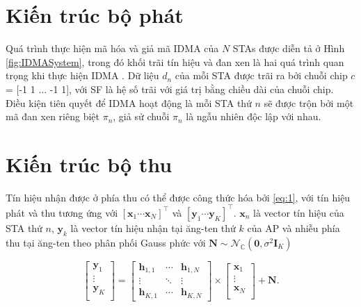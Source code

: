 \section{Kiến trúc bộ phát}\label{IIA}

Quá trình thực hiện mã hóa và giả mã IDMA của $N$ STAs được diễn tả ở Hình \ref{fig:IDMASystem}, trong đó khối trãi tín hiệu và đan xen là hai quá trình quan trọng khi thực hiện IDMA \cite{IDMA_LiPing}. Dữ liệu $d_n$ của mỗi STA được trãi ra bởi chuỗi chip $c$ = [-1 1 $\dots$ -1 1], với \acrshort{SF} là hệ số trãi với giá trị bằng chiều dài của chuỗi chip. Điều kiện tiên quyết để IDMA hoạt động là mỗi STA thứ $n$ sẽ được trộn bởi một mã đan xen riêng biệt $\pi_n$, giả sử chuỗi $\pi_n$ là ngẫu nhiên độc lập với nhau.

\section{Kiến trúc bộ thu}\label{IIB}

Tín hiệu nhận được ở phía thu có thể được công thức hóa bởi \eqref{eq:1}, với tín hiệu phát và thu tương ứng với $[\mathbf{x}_1 \cdots \mathbf{x}_N]^\top$ và $[\mathbf{y}_1 \cdots \mathbf{y}_K]^\top$. $\mathbf{x}_n$ là vector tín hiệu của STA thứ $n$, $\mathbf{y}_k$ là vector tín hiệu nhận tại ăng-ten thứ $k$ của AP và nhiễu phía thu tại ăng-ten theo phân phối Gauss phức với $\mathbf{N} \sim \mathcal{N}_\mathbb{C}(\mathbf{0},\sigma^2\mathbf{I}_K)$

\begin{equation}
	\begin{bmatrix}
		\mathbf{y}_1 \\
		\vdots       \\
		\mathbf{y}_K \\
	\end{bmatrix}
	=
	\begin{bmatrix}
		\mathbf{h}_{1,1} & \cdots & \mathbf{h}_{1,N} \\
		\vdots           & \ddots & \vdots           \\
		\mathbf{h}_{K,1} & \cdots & \mathbf{h}_{K,N}
	\end{bmatrix}
	\times
	\begin{bmatrix}
		\mathbf{x}_1 \\
		\vdots       \\
		\mathbf{x}_N \\
	\end{bmatrix}
	+
	\mathbf{N}.
	\label{eq:1}
\end{equation}

